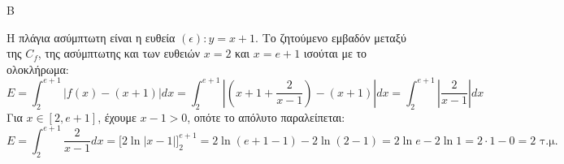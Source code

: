 \begin{thema}{Β}
\begin{erwthma}
\item Η πλάγια ασύμπτωτη είναι η ευθεία $(\epsilon): y = x+1$.
Το ζητούμενο εμβαδόν μεταξύ της $C_f$, της ασύμπτωτης και των ευθειών $x=2$ και $x=e+1$ ισούται με το ολοκλήρωμα:
\[ E = \int_2^{e+1} |f(x) - (x+1)| dx = \int_2^{e+1} \left| \left( x+1+\frac{2}{x-1} \right) - (x+1) \right| dx = \int_2^{e+1} \left| \frac{2}{x-1} \right| dx \]
Για $x \in [2, e+1]$, έχουμε $x-1 > 0$, οπότε το απόλυτο παραλείπεται:
\[ E = \int_2^{e+1} \frac{2}{x-1} dx = \Big[ 2\ln|x-1| \Big]_2^{e+1} = 2\ln(e+1-1) - 2\ln(2-1) = 2\ln e - 2\ln 1 = 2 \cdot 1 - 0 = 2 \text{ τ.μ.} \]
\end{erwthma}
\end{thema}

